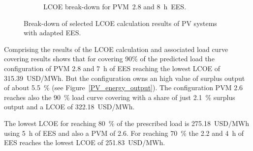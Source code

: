 \begin{figure}[!htbp]
\begin{subfigure}[b]{0.5\textwidth}
                \caption{LCOE break-down for PVM~2.8 and \SI{8}{h}~EES.}\label{PV_LCOE_highinvest_BreakDown}
        \end{subfigure}
        \caption[Break-down of selected LCOE calculation  results of PV systems with adapted EES.]{Break-down of selected LCOE calculation results of PV systems with adapted EES.}\label{SMPV_LCOE_BreakDown}
\end{figure}
Comprising the results of the LCOE calculation and associated load curve covering results shows that for covering 90\% of the predicted load the configuration of PVM 2.8 and \SI{7}{h} of EES reaching the lowest LCOE of \SI{315.39}{USD/MWh}. But the configuration owns an high value of surplus output of about 5.5~\% (see Figure~\ref{PV_energy_output}). The configuration PVM 2.6 reaches also the 90~\% load curve covering with a share of just 2.1~\% surplus output and a LCOE of \SI{322.18}{USD/MWh}.

The lowest LCOE for reaching 80~\% of the prescribed load is \SI{275.18}{USD/MWh} using \SI{5}{h} of EES and also a PVM of 2.6. For reaching 70~\% the 2.2 and \SI{4}{h} of EES reaches the lowest LCOE of \SI{251.83}{USD/MWh}.
\pagebreak
